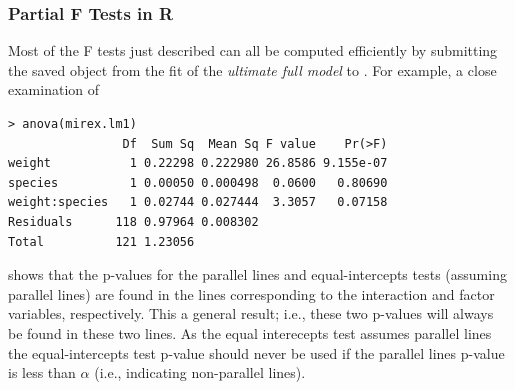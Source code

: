 \documentclass[10pt,openany]{book}\usepackage[]{graphicx}\usepackage[]{color}
\makeatletter
\newenvironment{kframe}{%
 \def\at@end@of@kframe{}%
 \ifinner\ifhmode%
  \def\at@end@of@kframe{\end{minipage}}%
  \begin{minipage}{\columnwidth}%
 \fi\fi%
 \def\FrameCommand##1{\hskip\@totalleftmargin \hskip-\fboxsep
 \colorbox{shadecolor}{##1}\hskip-\fboxsep
     \hskip-\linewidth \hskip-\@totalleftmargin \hskip\columnwidth}%
 \MakeFramed {\advance\hsize-\width
   \@totalleftmargin\z@ \linewidth\hsize
   \@setminipage}}%
 {\par\unskip\endMakeFramed%
 \at@end@of@kframe}
\newenvironment{knitrout}{}{} %
\makeatother
\begin{document}

\vspace{-12pt}

\subsubsection*{Partial F Tests in R}
Most of the F tests just described can all be computed efficiently by submitting the saved  object from the fit of the \emph{ultimate full model} to .  For example, a close examination of

\begin{knitrout}
\color{fgcolor}\begin{kframe}
\begin{verbatim}
> anova(mirex.lm1)
                Df  Sum Sq  Mean Sq F value    Pr(>F)
weight           1 0.22298 0.222980 26.8586 9.155e-07
species          1 0.00050 0.000498  0.0600   0.80690
weight:species   1 0.02744 0.027444  3.3057   0.07158
Residuals      118 0.97964 0.008302                  
Total          121 1.23056                           
\end{verbatim}
\end{kframe}
\end{knitrout}

shows that the p-values for the parallel lines and equal-intercepts tests (assuming parallel lines) are found in the lines corresponding to the interaction and factor variables, respectively.  This a general result; i.e., these two p-values will always be found in these two lines.  As the equal interecepts test assumes parallel lines the equal-intercepts test p-value should never be used if the parallel lines p-value is less than $\alpha$ (i.e., indicating non-parallel lines).


\vspace{-12pt}

\vspace{-12pt}
\end{document}
